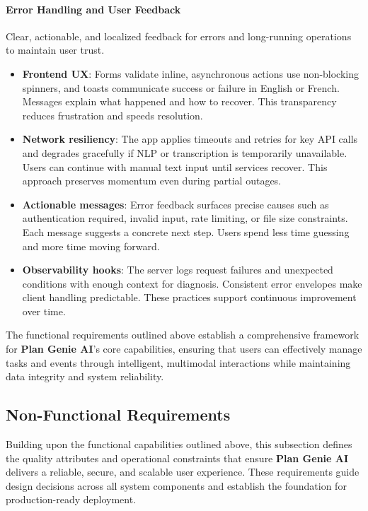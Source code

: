 \documentclass[12pt,a4paper]{article}
\begin{document}
\paragraph{Error Handling and User Feedback}\mbox{}

Clear, actionable, and localized feedback for errors and long-running operations to maintain user trust.
\begin{itemize}
  \item \textbf{Frontend UX}: Forms validate inline, asynchronous actions use non-blocking spinners, and toasts communicate success or failure in English or French. Messages explain what happened and how to recover. This transparency reduces frustration and speeds resolution.
  \item \textbf{Network resiliency}: The app applies timeouts and retries for key API calls and degrades gracefully if NLP or transcription is temporarily unavailable. Users can continue with manual text input until services recover. This approach preserves momentum even during partial outages.
  \item \textbf{Actionable messages}: Error feedback surfaces precise causes such as authentication required, invalid input, rate limiting, or file size constraints. Each message suggests a concrete next step. Users spend less time guessing and more time moving forward.
  \item \textbf{Observability hooks}: The server logs request failures and unexpected conditions with enough context for diagnosis. Consistent error envelopes make client handling predictable. These practices support continuous improvement over time.
\end{itemize}

The functional requirements outlined above establish a comprehensive framework for \textbf{Plan Genie AI}'s core capabilities, ensuring that users can effectively manage tasks and events through intelligent, multimodal interactions while maintaining data integrity and system reliability.

\subsection{Non-Functional Requirements}
Building upon the functional capabilities outlined above, this subsection defines the quality attributes and operational constraints that ensure \textbf{Plan Genie AI} delivers a reliable, secure, and scalable user experience. These requirements guide design decisions across all system components and establish the foundation for production-ready deployment.
\end{document}
